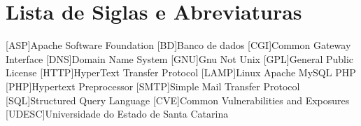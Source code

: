 \chapter*{Lista de Siglas e Abreviaturas}
\begin{acronym}

[ASP]{Apache Software Foundation}
[BD]{Banco de dados}
[CGI]{Common Gateway Interface}
[DNS]{Domain Name System}
[GNU]{Gnu Not Unix}
[GPL]{General Public License}
[HTTP]{HyperText Transfer Protocol}
[LAMP]{Linux Apache MySQL PHP}
[PHP]{Hypertext Preprocessor}
[SMTP]{Simple Mail Transfer Protocol}
[SQL]{Structured Query Language}
[CVE]{Common Vulnerabilities and Exposures}
[UDESC]{Universidade do Estado de Santa Catarina}
\begin{comment}
\acro{CLI}[CLI]{Command Line Interface}
\acro{CPU}[CPU]{Central Processing Unit}
\acro{DPCF}[DPCF]{Data Plane Control Function}
\acro{IETF}[IETF]{Internet Engineering Task Force}
\acro{IO}[I/O]{Input/Output}
\acro{LSD}[LSD]{Link State Database}
\acro{NFS}[NFS]{Network File System}
\acro{ONF}[ONF]{Open Networking Fundation}
\acro{OSPF}[OSPF]{Open Shortest Path First}
\acro{PRNG}[PRNG]{Pseudo-Random Number Generator}
\acro{QOS}[QOS]{Quality of Service}
\acro{RAM}[RAM]{Random Access Memory}
\acro{SDN}[SDN]{Software Defined Network}
\acro{SNMP}[SNMP]{Simple Network Management Protocol}
\end{comment}

\end{acronym}
